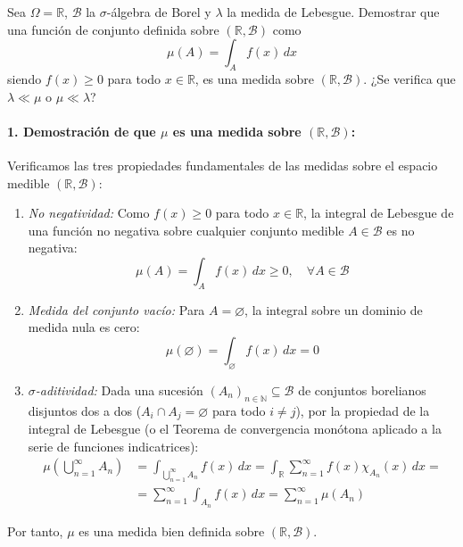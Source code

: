 \newpage
\begin{problema}
Sea $\Omega = \mathbb{R}$, $\mathcal{B}$ la $\sigma$-álgebra de Borel y $\lambda$ la medida de Lebesgue. Demostrar que una función de conjunto definida sobre $(\mathbb{R}, \mathcal{B})$ como
\[
    \mu(A) = \int_A f(x) \, dx
\]
siendo $f(x) \ge 0$ para todo $x \in \mathbb{R}$, es una medida sobre $(\mathbb{R}, \mathcal{B})$. ¿Se verifica que $\lambda \ll \mu$ o $\mu \ll \lambda$?

\tcblower

\paragraph{1. Demostración de que $\mu$ es una medida sobre $(\mathbb{R}, \mathcal{B})$:}
Verificamos las tres propiedades fundamentales de las medidas sobre el espacio medible $(\mathbb{R}, \mathcal{B})$:
\begin{enumerate}[label=\alph*)]
    \item \textit{No negatividad:} Como $f(x) \ge 0$ para todo $x \in \mathbb{R}$, la integral de Lebesgue de una función no negativa sobre cualquier conjunto medible $A \in \mathcal{B}$ es no negativa:
    \[
        \mu(A) = \int_A f(x) \, dx \ge 0, \quad \forall A \in \mathcal{B}
    \]
    \item \textit{Medida del conjunto vacío:} Para $A = \varnothing$, la integral sobre un dominio de medida nula es cero:
    \[
        \mu(\varnothing) = \int_\varnothing f(x) \, dx = 0
    \]
    \item \textit{$\sigma$-aditividad:} Dada una sucesión $(A_n)_{n \in \mathbb{N}} \subseteq \mathcal{B}$ de conjuntos borelianos disjuntos dos a dos ($A_i \cap A_j = \varnothing$ para todo $i \neq j$), por la propiedad de la integral de Lebesgue (o el Teorema de convergencia monótona aplicado a la serie de funciones indicatrices):
    \[
    \begin{array}{rl}
        \displaystyle \mu\left( \bigcup_{n=1}^\infty A_n \right) & \displaystyle = \int_{\bigcup_{n=1}^\infty A_n} f(x) \, dx = \int_{\mathbb{R}} \sum_{n=1}^\infty f(x) \chi_{A_n}(x) \, dx = \\[16pt]
        & \displaystyle = \sum_{n=1}^\infty \int_{A_n} f(x) \, dx = \sum_{n=1}^\infty \mu(A_n)
    \end{array}
    \]
\end{enumerate}
Por tanto, $\mu$ es una medida bien definida sobre $(\mathbb{R}, \mathcal{B})$.
\newpage

\end{problema}
